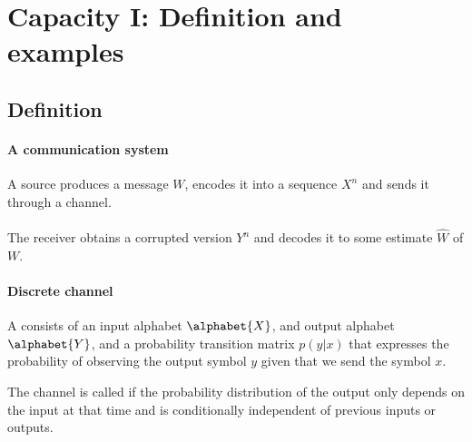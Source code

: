 
\section{Capacity I: Definition and examples}
\label{sec:33}




\subsection{Definition}

\paragraph{A communication system}
A source produces a message $W$, encodes it into a sequence $X^n$ and sends it through a channel.\\
~\\
The receiver obtains a corrupted version $Y^n$ and decodes it to some estimate $\hat{W}$ of $W$.

\begin{center}
\end{center}





\paragraph{Discrete channel}


A  consists of an input alphabet $\alphabet{X}$, and output alphabet $\alphabet{Y}$, and a probability transition matrix $p(y | x)$ that expresses the probability of observing the output symbol $y$ given that we send the symbol $x$.

The channel is called  if the probability distribution of the output only depends on the input at that time and is conditionally independent of previous inputs or outputs.


